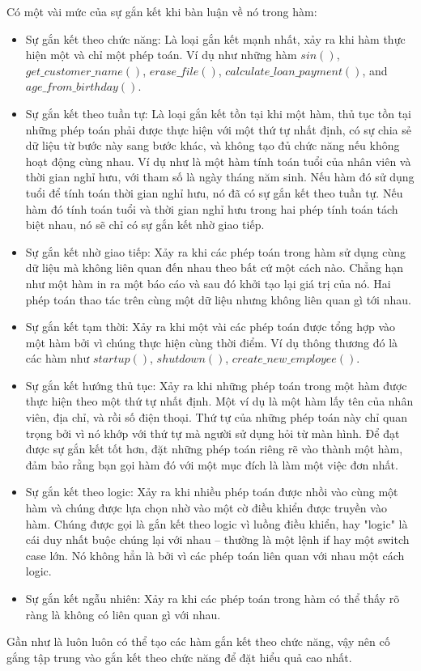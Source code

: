 \documentclass[12pt]{report}
\begin{document}
Có một vài mức của sự gắn kết khi bàn luận về nó trong hàm: 
\begin{itemize}
	\item Sự gắn kết theo chức năng: Là loại gắn kết mạnh nhất, xảy ra khi hàm thực hiện một và chỉ một phép toán. Ví dụ như những hàm $sin()$, $get\_customer\_name()$, $erase\_file()$, $calculate\_loan\_payment()$, and $age\_from\_birthday()$.
	\item Sự gắn kết theo tuần tự: Là loại gắn kết tồn tại khi một hàm, thủ tục tồn tại những phép toán phải được thực hiện với một thứ tự nhất định, có sự chia sẻ dữ liệu từ bước này sang bước khác, và không tạo đủ chức năng nếu không hoạt động cùng nhau. Ví dụ như là một hàm tính toán tuổi của nhân viên và thời gian nghỉ hưu, với tham số là ngày tháng năm sinh. Nếu hàm đó sử dụng tuổi để tính toán thời gian nghỉ hưu, nó đã có sự gắn kết theo tuần tự. Nếu hàm đó tính toán tuổi và thời gian nghỉ hưu trong hai phép tính toán tách biệt nhau, nó sẽ chỉ có sự gắn kết nhờ giao tiếp.
	\item Sự gắn kết nhờ giao tiếp: Xảy ra khi các phép toán trong hàm sử dụng cùng dữ liệu mà không liên quan đến nhau theo bất cứ một cách nào. Chẳng hạn như một hàm in ra một báo cáo và sau đó khởi tạo lại giá trị của nó. Hai phép toán thao tác trên cùng một dữ liệu nhưng không liên quan gì tới nhau. 	
	\item Sự gắn kết tạm thời: Xảy ra khi một vài các phép toán được tổng hợp vào một hàm bởi vì chúng thực hiện cùng thời điểm. Ví dụ thông thương đó là các hàm như $startup()$, $shutdown()$, $create\_new\_employee()$.
	\item Sự gắn kết hướng thủ tục: Xảy ra khi những phép toán trong một hàm được thực hiện theo một thứ tự nhất định. Một ví dụ là một hàm lấy tên của nhân viên, địa chỉ, và rồi số điện thoại. Thứ tự của những phép toán này chỉ quan trọng bởi vì nó khớp với thứ tự mà người sử dụng hỏi từ màn hình. Để đạt được sự gắn kết tốt hơn, đặt những phép toán riêng rẽ vào thành một hàm, đảm bảo rằng bạn gọi hàm đó với một mục đích là làm một việc đơn nhất. 
	\item Sự gắn kết theo logic: Xảy ra khi nhiều phép toán được nhồi vào cùng một hàm và chúng được lựa chọn nhờ vào một cờ điều khiển được truyền vào hàm. Chúng được gọi là gắn kết theo logic vì luồng điều khiển, hay "logic" là cái duy nhất buộc chúng lại với nhau -- thường là một lệnh if hay một switch case lớn. Nó không hẳn là bởi vì các phép toán liên quan với nhau một cách logic. 
	\item Sự gắn kết ngẫu nhiên: Xảy ra khi các phép toán trong hàm có thể thấy rõ ràng là không có liên quan gì với nhau. 
\end{itemize}
Gần như là luôn luôn có thể tạo các hàm gắn kết theo chức năng, vậy nên cố gắng tập trung vào gắn kết theo chức năng để đặt hiểu quả cao nhất. 
\end{document}
